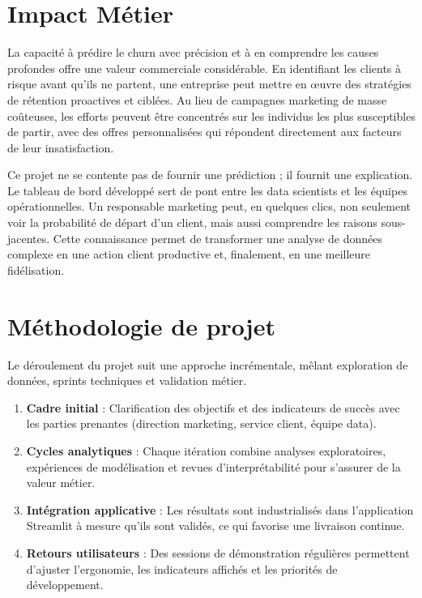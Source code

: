 \section{Impact Métier}
La capacité à prédire le churn avec précision et à en comprendre les causes profondes offre une valeur commerciale considérable. En identifiant les clients à risque avant qu'ils ne partent, une entreprise peut mettre en œuvre des stratégies de rétention proactives et ciblées. Au lieu de campagnes marketing de masse coûteuses, les efforts peuvent être concentrés sur les individus les plus susceptibles de partir, avec des offres personnalisées qui répondent directement aux facteurs de leur insatisfaction.

Ce projet ne se contente pas de fournir une prédiction ; il fournit une explication. Le tableau de bord développé sert de pont entre les data scientists et les équipes opérationnelles. Un responsable marketing peut, en quelques clics, non seulement voir la probabilité de départ d'un client, mais aussi comprendre les raisons sous-jacentes. Cette connaissance permet de transformer une analyse de données complexe en une action client productive et, finalement, en une meilleure fidélisation.

\section{Méthodologie de projet}
Le déroulement du projet suit une approche incrémentale, mêlant exploration de données, sprints techniques et validation métier.
\begin{enumerate}
    \item \textbf{Cadre initial} : Clarification des objectifs et des indicateurs de succès avec les parties prenantes (direction marketing, service client, équipe data).
    \item \textbf{Cycles analytiques} : Chaque itération combine analyses exploratoires, expériences de modélisation et revues d'interprétabilité pour s'assurer de la valeur métier.
    \item \textbf{Intégration applicative} : Les résultats sont industrialisés dans l'application Streamlit à mesure qu'ils sont validés, ce qui favorise une livraison continue.
    \item \textbf{Retours utilisateurs} : Des sessions de démonstration régulières permettent d'ajuster l'ergonomie, les indicateurs affichés et les priorités de développement.
\end{enumerate}

